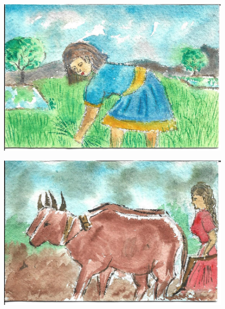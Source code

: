 \documentclass[12pt]{article}
\begin{document}
\newpage

\begin{figure}[h!]
\centering
\includegraphics[width=.7\paperwidth]{pictures/LW}
\end{figure}

\newpage

\begin{figure}[h!]
\centering
\includegraphics[width=.7\paperwidth]{pictures/AP}
\end{figure}

\newpage
\end{document}
